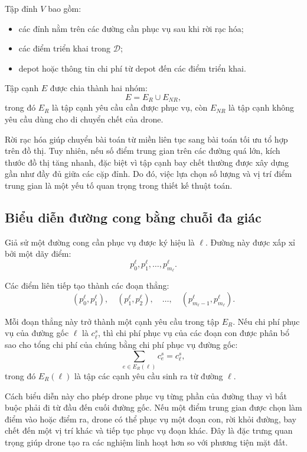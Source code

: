 Tập đỉnh $V$ bao gồm:
\begin{itemize}
\item các đỉnh nằm trên các đường cần phục vụ sau khi rời rạc hóa;
\item các điểm triển khai trong $\mathcal{D}$;
\item depot hoặc thông tin chi phí từ depot đến các điểm triển khai.
\end{itemize}

Tập cạnh $E$ được chia thành hai nhóm:
\begin{equation}
E = E_R \cup E_{NR},
\end{equation}
trong đó $E_R$ là tập cạnh yêu cầu cần được phục vụ, còn $E_{NR}$ là tập cạnh không yêu cầu dùng cho di chuyển chết của drone.

Rời rạc hóa giúp chuyển bài toán từ miền liên tục sang bài toán tối ưu tổ hợp trên đồ thị. Tuy nhiên, nếu số điểm trung gian trên các đường quá lớn, kích thước đồ thị tăng nhanh, đặc biệt vì tập cạnh bay chết thường được xây dựng gần như đầy đủ giữa các cặp đỉnh. Do đó, việc lựa chọn số lượng và vị trí điểm trung gian là một yếu tố quan trọng trong thiết kế thuật toán.

\subsection{Biểu diễn đường cong bằng chuỗi đa giác}

Giả sử một đường cong cần phục vụ được ký hiệu là $\ell$. Đường này được xấp xỉ bởi một dãy điểm:
\begin{equation}
p^\ell_0, p^\ell_1, \ldots, p^\ell_{m_\ell}.
\end{equation}

Các điểm liên tiếp tạo thành các đoạn thẳng:
\begin{equation}
(p^\ell_0, p^\ell_1),\quad
(p^\ell_1, p^\ell_2),\quad
\ldots,\quad
(p^\ell_{m_\ell-1}, p^\ell_{m_\ell}).
\end{equation}

Mỗi đoạn thẳng này trở thành một cạnh yêu cầu trong tập $E_R$. Nếu chi phí phục vụ của đường gốc $\ell$ là $c^s_\ell$, thì chi phí phục vụ của các đoạn con được phân bổ sao cho tổng chi phí của chúng bằng chi phí phục vụ đường gốc:
\begin{equation}
\sum_{e \in E_R(\ell)} c^s_e = c^s_\ell,
\end{equation}
trong đó $E_R(\ell)$ là tập các cạnh yêu cầu sinh ra từ đường $\ell$.

Cách biểu diễn này cho phép drone phục vụ từng phần của đường thay vì bắt buộc phải đi từ đầu đến cuối đường gốc. Nếu một điểm trung gian được chọn làm điểm vào hoặc điểm ra, drone có thể phục vụ một đoạn con, rời khỏi đường, bay chết đến một vị trí khác và tiếp tục phục vụ đoạn khác. Đây là đặc trưng quan trọng giúp drone tạo ra các nghiệm linh hoạt hơn so với phương tiện mặt đất.

